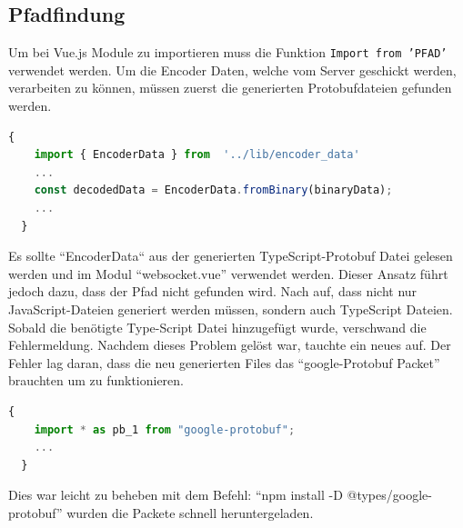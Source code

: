 \subsection{Pfadfindung}
\label{subsubsec:problem_Pfadfindung}
Um bei Vue.js Module zu importieren muss die Funktion \texttt{Import from 'PFAD'} verwendet werden.
%
Um die Encoder Daten, welche vom Server geschickt werden, verarbeiten zu können, 
müssen zuerst die generierten Protobufdateien gefunden werden.
%
\begin{lstlisting}[language=JavaScript,gobble=4]
  {
    import { EncoderData } from  '../lib/encoder_data'
    ...
    const decodedData = EncoderData.fromBinary(binaryData);
    ...
  }
\end{lstlisting}
Es sollte ``EncoderData`` aus der generierten TypeScript-Protobuf Datei gelesen werden und im Modul ``websocket.vue'' verwendet werden.
Dieser Ansatz führt jedoch dazu, dass der Pfad nicht gefunden wird. 
%
Nach auf, dass nicht nur JavaScript-Dateien generiert werden müssen, sondern auch TypeScript Dateien.
Sobald die benötigte Type-Script Datei hinzugefügt wurde, verschwand die Fehlermeldung.
%
Nachdem dieses Problem gelöst war, tauchte ein neues auf.
Der Fehler lag daran, dass die neu generierten Files das ``google-Protobuf Packet'' brauchten um zu funktionieren.
% 
\begin{lstlisting}[language=JavaScript,gobble=4]
  {
    import * as pb_1 from "google-protobuf";
    ...
  }
\end{lstlisting}
Dies war leicht zu beheben mit dem Befehl: ``npm install -D @types/google-protobuf'' wurden die Packete schnell
heruntergeladen.

